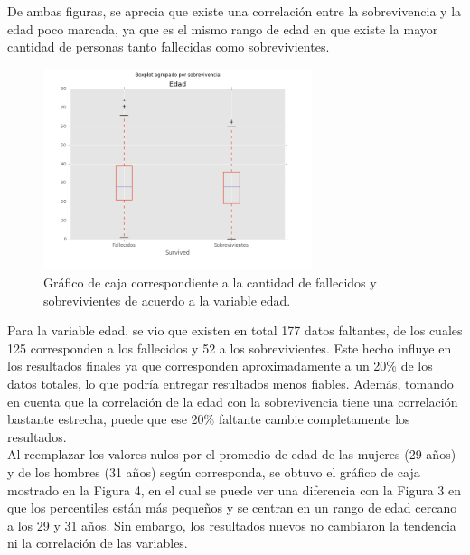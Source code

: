 \documentclass[letter, 10pt]{article}
\begin{document}
De ambas figuras, se aprecia que existe una correlación entre la sobrevivencia y la edad poco marcada, ya que es el mismo rango de edad en que existe la mayor cantidad de personas tanto fallecidas como sobrevivientes.

\begin{figure}[H]
\begin{center}
\includegraphics[width=0.7\textwidth]{Images/figure_3.png}
\caption{Gráfico de caja correspondiente a la cantidad de fallecidos y sobrevivientes de acuerdo a la variable edad.}
\end{center}
\end{figure}

Para la variable edad, se vio que existen en total 177 datos faltantes, de los cuales 125 corresponden a los fallecidos y 52 a los sobrevivientes. Este hecho influye en los resultados finales ya que corresponden aproximadamente a un 20\% de los datos totales, lo que podría entregar resultados menos fiables. Además, tomando en cuenta que la correlación de la edad con la sobrevivencia tiene una correlación bastante estrecha, puede que ese 20\% faltante cambie completamente los resultados. \\

Al reemplazar los valores nulos por el promedio de edad de las mujeres (29 años) y de los hombres (31 años)  según corresponda, se obtuvo el gráfico de caja mostrado en la Figura 4, en el cual se puede ver una diferencia con la Figura 3 en que los percentiles están más pequeños y se centran en un rango de edad cercano a los 29 y 31 años. Sin embargo, los resultados nuevos no cambiaron la tendencia ni la correlación de las variables.
\end{document}
